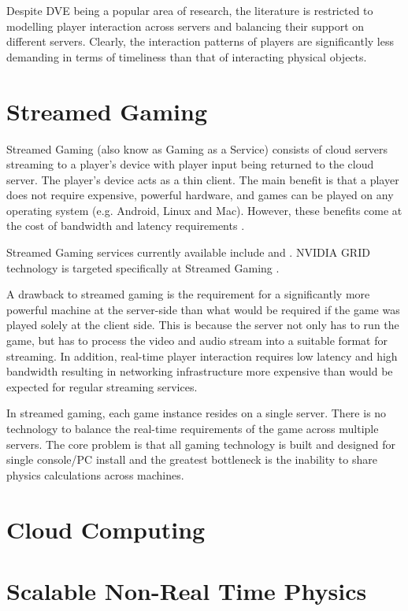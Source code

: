 Despite DVE being a popular area of research, the literature is restricted to modelling player interaction across servers and balancing their support on different servers. Clearly, the interaction patterns of players are significantly less demanding in terms of timeliness than that of interacting physical objects.

\section{Streamed Gaming}
Streamed Gaming (also know as Gaming as a Service) consists of cloud servers streaming to a player's device with player input being returned to the cloud server. The player's device acts as a thin client. The main benefit is that a player does not require expensive, powerful hardware, and games can be played on any operating system (e.g. Android, Linux and Mac). However, these benefits come at the cost of bandwidth and latency requirements \cite{iCloudAccess}.

Streamed Gaming services currently available include \cite{NVidiaGameStream} and \cite{PSNOW}. NVIDIA GRID technology is targeted specifically at Streamed Gaming \cite{NVIDIACloud}.

A drawback to streamed gaming is the requirement for a significantly more powerful machine at the server-side than what would be required if the game was played solely at the client side. This is because the server not only has to run the game, but has to process the video and audio stream into a suitable format for streaming. In addition, real-time player interaction requires low latency and high bandwidth resulting in networking infrastructure more expensive than would be expected for regular streaming services. 

In streamed gaming, each game instance resides on a single server. There is no technology to balance the real-time requirements of the game across multiple servers. The core problem is that all gaming technology is built and designed for single console/PC install and the greatest bottleneck is the inability to share physics calculations across machines.

\section{Cloud Computing}
\section{Scalable Non-Real Time Physics}

